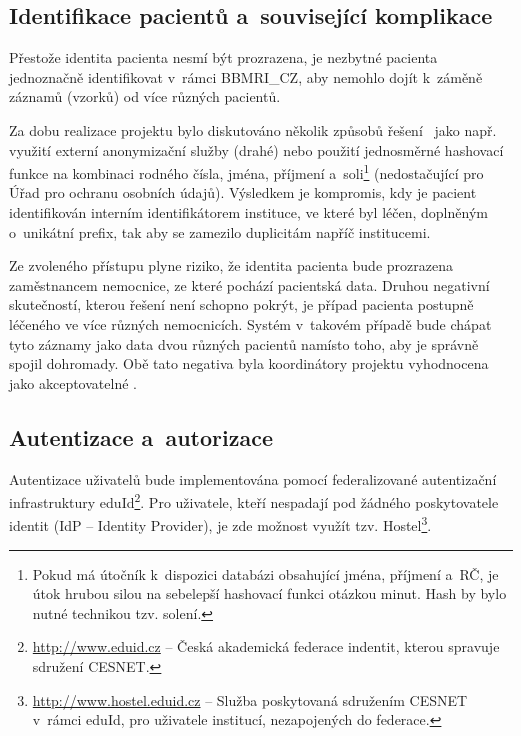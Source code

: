 \documentclass[11pt, final, oneside]{fithesis2}
\newcommand{\ProjectName}{\mbox{BBMRI\_CZ}\xspace}
\begin{document}
\subsection{Identifikace pacientů a~související komplikace}
Přestože identita pacienta nesmí být prozrazena, je nezbytné pacienta jednoznačně identifikovat v~rámci \ProjectName, aby nemohlo dojít k~záměně záznamů (vzorků) od více různých pacientů. 

Za dobu realizace projektu bylo diskutováno několik způsobů řešení~\cite{ARCH_2014_1_25} jako např. využití externí anonymizační služby (drahé) nebo použití jednosměrné hashovací funkce na kombinaci rodného čísla, jména, příjmení a~soli\footnote{Pokud má útočník k~dispozici databázi obsahující jména, příjmení a~RČ, je útok hrubou silou na sebelepší hashovací funkci otázkou minut. Hash by bylo nutné  technikou tzv. solení.} (nedostačující pro Úřad pro ochranu osobních údajů). 
Výsledkem je kompromis, kdy je pacient identifikován interním identifikátorem instituce, ve které byl léčen, doplněným o~unikátní prefix, tak aby se zamezilo duplicitám napříč institucemi.

Ze zvoleného přístupu plyne riziko, že identita pacienta bude prozrazena zaměstnancem nemocnice, ze které pochází pacientská data. Druhou negativní skutečností, kterou řešení není schopno pokrýt, je případ pacienta postupně léčeného ve více různých nemocnicích. Systém v~takovém případě bude chápat tyto záznamy jako data dvou různých pacientů namísto toho, aby je správně spojil dohromady. Obě tato negativa byla koordinátory projektu vyhodnocena jako akceptovatelné .

\subsection{Autentizace a~autorizace}\label{chapter:analysis:subsection:authorization}
Autentizace uživatelů bude implementována pomocí federalizované autentizační infrastruktury eduId\footnote{\url{http://www.eduid.cz} -- Česká akademická federace indentit, kterou spravuje sdružení CESNET.}. Pro uživatele, kteří nespadají pod žádného poskytovatele identit (IdP -- Identity Provider), je zde možnost využít tzv. Hostel\footnote{\url{http://www.hostel.eduid.cz} -- Služba poskytovaná sdružením CESNET v~rámci eduId, pro uživatele institucí, nezapojených do federace.}. 
\end{document}
